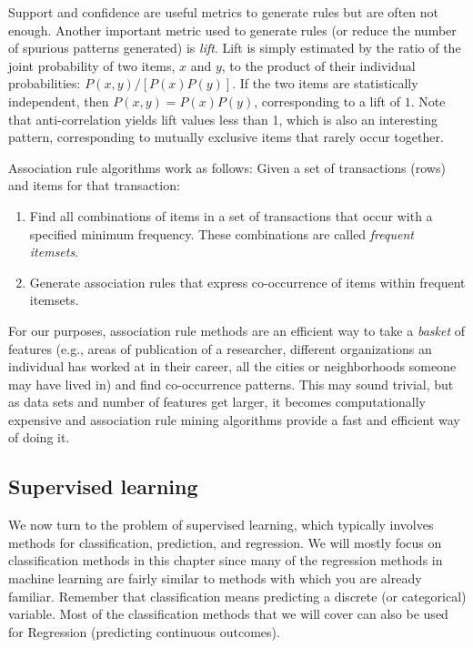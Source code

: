 \documentclass[]{krantz}
\begin{document}
Support and confidence are useful metrics to generate rules but are
often not enough. Another important metric used to generate rules (or
reduce the number of spurious patterns generated) is \emph{lift}. Lift
is simply estimated by the ratio of the joint probability of two items,
\(x\) and \(y\), to the product of their individual probabilities:
\(P(x,y)/[P(x)P(y)]\). If the two items are statistically independent,
then \(P(x,y)=P(x)P(y)\), corresponding to a lift of \(1\). Note that
anti-correlation yields lift values less than 1, which is also an
interesting pattern, corresponding to mutually exclusive items that
rarely occur together.

Association rule algorithms work as follows: Given a set of transactions
(rows) and items for that transaction:

\begin{enumerate}
\def\labelenumi{\arabic{enumi}.}
\item
  Find all combinations of items in a set of transactions that occur
  with a specified minimum frequency. These combinations are called
  \emph{frequent itemsets}.
\item
  Generate association rules that express co-occurrence of items within
  frequent itemsets.
\end{enumerate}

For our purposes, association rule methods are an efficient way to take
a \emph{basket} of features (e.g., areas of publication of a researcher,
different organizations an individual has worked at in their career, all
the cities or neighborhoods someone may have lived in) and find
co-occurrence patterns. This may sound trivial, but as data sets and
number of features get larger, it becomes computationally expensive and
association rule mining algorithms provide a fast and efficient way of
doing it.

\subsection{Supervised learning}\label{sec:MLchapter:super}

We now turn to the problem of supervised learning, which typically
involves methods for classification, prediction, and regression. We will
mostly focus on classification methods in this chapter since many of the
regression methods in machine learning are fairly similar to methods
with which you are already familiar. Remember that classification means
predicting a discrete (or categorical) variable. Most of the
classification methods that we will cover can also be used for
Regression (predicting continuous outcomes).
\end{document}
